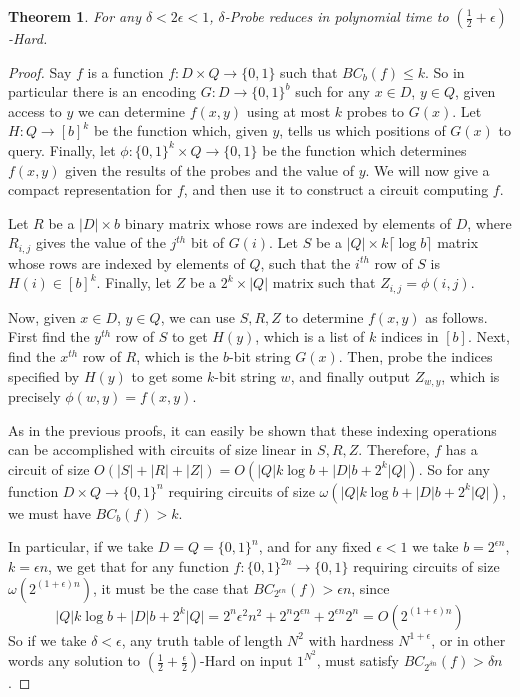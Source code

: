 \documentclass[11pt]{article}
\newtheorem{theorem}{Theorem}
\begin{document}
\begin{theorem}\label{thm:probe-circuit}
For any $\delta < 2\epsilon < 1$, {\sc $\delta$-Probe} reduces in polynomial time to {\sc $(\frac{1}{2} + \epsilon)$-Hard}.
\end{theorem}
\begin{proof}

Say $f$ is a function $f: D \times Q \rightarrow \{0,1\}$ such that $BC_b(f) \leq k$. So in particular there is an encoding $G: D \rightarrow \{0,1\}^b$ such for any $x \in D$, $y \in Q$, given access to $y$ we can determine $f(x,y)$ using at most $k$ probes to $G(x)$. Let $H: Q \rightarrow [b]^k$ be the function which, given $y$, tells us which positions of $G(x)$ to query. Finally, let $\phi: \{0,1\}^k \times Q \rightarrow \{0,1\}$ be the function which determines $f(x,y)$ given the results of the probes and the value of $y$. We will now give a compact representation for $f$, and then use it to construct a circuit computing $f$.

Let $R$ be a $|D| \times b$ binary matrix whose rows are indexed by elements of $D$, where $R_{i,j}$ gives the value of the $j^{th}$ bit of $G(i)$. Let $S$ be a $|Q| \times k \lceil \log b \rceil$ matrix whose rows are indexed by elements of $Q$, such that the $i^{th}$ row of $S$ is $H(i) \in [b]^k$. Finally, let $Z$ be a $2^k \times |Q|$ matrix such that $Z_{i,j} = \phi(i,j)$.

Now, given $x \in D$, $y \in Q$, we can use $S,R,Z$ to determine $f(x,y)$ as follows. First find the $y^{th}$ row of $S$ to get $H(y)$, which is a list of $k$ indices in $[b]$. Next, find the $x^{th}$ row of $R$, which is the $b$-bit string $G(x)$. Then, probe the indices specified by $H(y)$ to get some $k$-bit string $w$, and finally output $Z_{w, y}$, which is precisely $\phi(w,y) = f(x,y)$.

As in the previous proofs, it can easily be shown that these indexing operations can be accomplished with circuits of size linear in $S,R,Z$. Therefore, $f$ has a circuit of size $O(|S| + |R| + |Z|) = O(|Q|k\log b + |D|b + 2^k|Q|)$. So for any function $D \times Q \rightarrow \{0,1\}^n$ requiring circuits of size $\omega(|Q|k\log b + |D|b + 2^k|Q|)$, we must have $BC_b(f) > k$. 

In particular, if we take $D = Q = \{0,1\}^n$, and for any fixed $\epsilon < 1$ we take $b= 2^{\epsilon n}$, $k = \epsilon n$, we get that for any function $f: \{0,1\}^{2n} \rightarrow \{0,1\}$ requiring circuits of size $\omega(2^{(1 +\epsilon) n})$, it must be the case that $BC_{2^{\epsilon n}}(f) > \epsilon n$, since 
\[
|Q|k\log b + |D|b + 2^k|Q| = 2^n \epsilon^2 n^2 + 2^n2^{\epsilon n} + 2^{\epsilon n}2^n = O(2^{(1+\epsilon) n})
\]
So if we take $\delta < \epsilon$, any truth table of length $N^2$ with hardness $N^{1+\epsilon}$, or in other words any solution to {\sc $(\frac{1}{2} + \frac{\epsilon}{2})$-Hard} on input $1^{N^2}$, must satisfy $BC_{2^{\delta n}}(f) > \delta n$. 
\end{proof}
\end{document}
